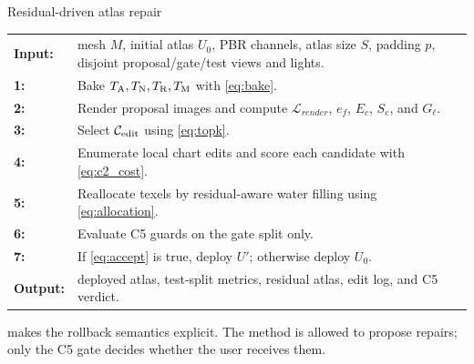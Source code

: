\begin{pseudocode}{Residual-driven atlas repair}
\label{alg:pipeline}
\begin{tabularx}{\linewidth}{@{}lX@{}}
\textbf{Input:} & mesh \(M\), initial atlas \(U_0\), PBR channels, atlas size \(S\), padding \(p\), disjoint proposal/gate/test views and lights.\\
\textbf{1:} & Bake \(T_{\mathrm{A}},T_{\mathrm{N}},T_{\mathrm{R}},T_{\mathrm{M}}\) with \cref{eq:bake}.\\
\textbf{2:} & Render proposal images and compute \(\mathcal{L}_{render}\), \(e_f\), \(E_c\), \(S_e\), and \(G_\ell\).\\
\textbf{3:} & Select \(\mathcal{C}_{\mathrm{edit}}\) using \cref{eq:topk}.\\
\textbf{4:} & Enumerate local chart edits and score each candidate with \cref{eq:c2_cost}.\\
\textbf{5:} & Reallocate texels by residual-aware water filling using \cref{eq:allocation}.\\
\textbf{6:} & Evaluate C5 guards on the gate split only.\\
\textbf{7:} & If \cref{eq:accept} is true, deploy \(U'\); otherwise deploy \(U_0\).\\
\textbf{Output:} & deployed atlas, test-split metrics, residual atlas, edit log, and C5 verdict.\\
\end{tabularx}
\end{pseudocode}

 makes the rollback semantics explicit. The method is allowed to propose repairs; only the C5 gate decides whether the user receives them.
